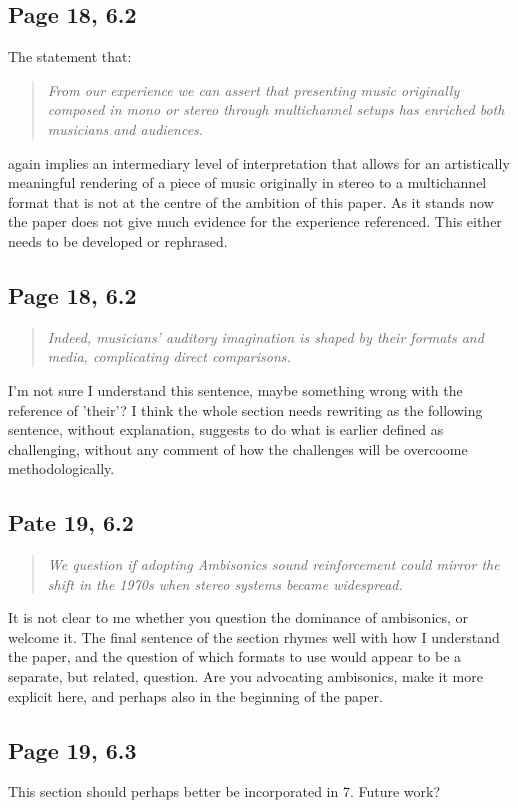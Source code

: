 \documentclass[11pt]{article}
\begin{document}
\subsection*{Page 18, 6.2}
\label{sec:org157acb5}
The statement that:
\begin{quote}
\emph{From our experience we can assert that presenting music originally composed in mono or
stereo through multichannel setups has enriched both musicians and audiences.}
\end{quote}
again implies an intermediary level of interpretation that allows for an artistically meaningful rendering of a piece of music originally in stereo to a multichannel format that is not at the centre of the ambition of this paper. As it stands now the paper does not give much evidence for the experience referenced. This either needs to be developed or rephrased.
\subsection*{Page 18, 6.2}
\label{sec:org9066aa3}
\begin{quote}
\emph{Indeed, musicians' auditory imagination is shaped by their formats and media, complicating direct comparisons.}
\end{quote}
I'm not sure I understand this sentence, maybe something wrong with the reference of 'their'? I think the whole section needs rewriting as the following sentence, without explanation, suggests to do what is earlier defined as challenging, without any comment of how the challenges will be overcoome methodologically.
\subsection*{Pate 19, 6.2}
\label{sec:orgacc59e1}
\begin{quote}
\emph{We question if adopting Ambisonics sound reinforcement could mirror the shift in the 1970s
when stereo systems became widespread.}
\end{quote}
It is not clear to me whether you question the dominance of ambisonics, or welcome it. The final sentence of the section rhymes well with how I understand the paper, and the question of which formats to use would appear to be a separate, but related, question. Are you advocating ambisonics, make it more explicit here, and perhaps also in the beginning of the paper.
\subsection*{Page 19, 6.3}
\label{sec:org35f6f57}
This section should perhaps better be incorporated in 7. Future work?
\end{document}
